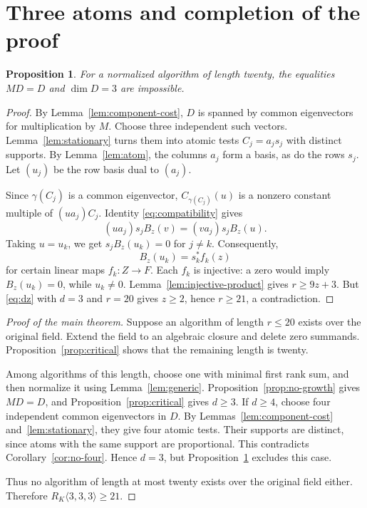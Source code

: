 \documentclass[11pt,a4paper]{article}
\numberwithin{equation}{section}
\theoremstyle{plain}
\newtheorem{prop}[theorem]{Proposition}
\theoremstyle{definition}
\newcommand{\leqs}{\leqslant}\newcommand{\geqs}{\geqslant}
\begin{document}
\section{Three atoms and completion of the proof}

\begin{prop}\label{prop:three}
For a normalized algorithm of length twenty, the equalities $MD=D$
and $\dim D=3$ are impossible.
\end{prop}
\begin{proof}
By Lemma~\ref{lem:component-cost}, $D$ is spanned by common eigenvectors
for multiplication by $M$. Choose three independent such vectors.
Lemma~\ref{lem:stationary} turns them into atomic tests $C_j=a_js_j$
with distinct supports. By Lemma~\ref{lem:atom}, the columns $a_j$
form a basis, as do the rows $s_j$. Let $(u_j)$ be the row basis dual
to $(a_j)$.

Since $\gamma(C_j)$ is a common eigenvector, $C_{\gamma(C_j)}(u)$ is
a nonzero constant multiple of $(ua_j)C_j$.
Identity \eqref{eq:compatibility} gives
\[
 (ua_j)s_j B_z(v)=(va_j)s_j B_z(u).
\]
Taking $u=u_k$, we get $s_jB_z(u_k)=0$ for $j\ne k$.
Consequently,
\[
 B_z(u_k)=s_k^*f_k(z)
\]
for certain linear maps $f_k:Z\to F$.
Each $f_k$ is injective: a zero would imply $B_z(u_k)=0$, while
$u_k\ne0$. Lemma~\ref{lem:injective-product} gives $r\geqs9z+3$.
But \eqref{eq:dz} with $d=3$ and $r=20$ gives $z\geqs2$, hence
$r\geqs21$, a contradiction.
\end{proof}

\begin{proof}[Proof of the main theorem]
Suppose an algorithm of length $r\leqs20$ exists over the original
field. Extend the field to an algebraic closure and delete zero
summands. Proposition~\ref{prop:critical} shows that the remaining
length is twenty.

Among algorithms of this length, choose one with minimal first rank
sum, and then normalize it using Lemma~\ref{lem:generic}.
Proposition~\ref{prop:no-growth} gives $MD=D$, and
Proposition~\ref{prop:critical} gives $d\geqs3$.
If $d\geqs4$, choose four independent common eigenvectors in $D$.
By Lemmas~\ref{lem:component-cost} and~\ref{lem:stationary}, they give
four atomic tests. Their supports are distinct, since atoms with the
same support are proportional. This contradicts Corollary~\ref{cor:no-four}.
Hence $d=3$, but Proposition~\ref{prop:three} excludes this case.

Thus no algorithm of length at most twenty exists over the original
field either. Therefore $R_K\langle3,3,3\rangle\geqs21$.
\end{proof}
\end{document}

